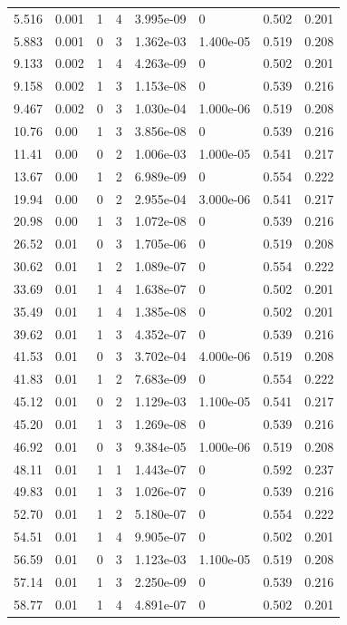 \documentclass[preview]{standalone}
\begin{document}
{{\begin{tabular}{L{1.2cm}C{1.2cm} C{0.3cm}C{0.5cm} C{1.4cm}C{1.4cm} C{1.4cm}C{1.4cm}}
  5.516  &  0.001  & 1     &  4 &  3.995e-09  & 0  & 0.502 &  0.201   \\ 
  5.883  &  0.001  & 0     &  3 &  1.362e-03  & 1.400e-05  & 0.519 &  0.208   \\ 
  9.133  &  0.002  & 1     &  4 &  4.263e-09  & 0  & 0.502 &  0.201   \\ 
  9.158  &  0.002  & 1     &  3 &  1.153e-08  & 0  & 0.539 &  0.216   \\ 
  9.467  &  0.002  & 0     &  3 &  1.030e-04  & 1.000e-06  & 0.519 &  0.208   \\ 
  10.76  &  0.00  & 1     &  3 &  3.856e-08  & 0  & 0.539 &  0.216   \\ 
  11.41  &  0.00  & 0     &  2 &  1.006e-03  & 1.000e-05  & 0.541 &  0.217   \\ 
  13.67  &  0.00  & 1     &  2 &  6.989e-09  & 0  & 0.554 &  0.222   \\ 
  19.94  &  0.00  & 0     &  2 &  2.955e-04  & 3.000e-06  & 0.541 &  0.217   \\ 
  20.98  &  0.00  & 1     &  3 &  1.072e-08  & 0  & 0.539 &  0.216   \\ 
  26.52  &  0.01  & 0     &  3 &  1.705e-06  & 0  & 0.519 &  0.208   \\ 
  30.62  &  0.01  & 1     &  2 &  1.089e-07  & 0  & 0.554 &  0.222   \\ 
  33.69  &  0.01  & 1     &  4 &  1.638e-07  & 0  & 0.502 &  0.201   \\ 
  35.49  &  0.01  & 1     &  4 &  1.385e-08  & 0  & 0.502 &  0.201   \\ 
  39.62  &  0.01  & 1     &  3 &  4.352e-07  & 0  & 0.539 &  0.216   \\ 
  41.53  &  0.01  & 0     &  3 &  3.702e-04  & 4.000e-06  & 0.519 &  0.208   \\ 
  41.83  &  0.01  & 1     &  2 &  7.683e-09  & 0  & 0.554 &  0.222   \\ 
  45.12  &  0.01  & 0     &  2 &  1.129e-03  & 1.100e-05  & 0.541 &  0.217   \\ 
  45.20  &  0.01  & 1     &  3 &  1.269e-08  & 0  & 0.539 &  0.216   \\ 
  46.92  &  0.01  & 0     &  3 &  9.384e-05  & 1.000e-06  & 0.519 &  0.208   \\ 
  48.11  &  0.01  & 1     &  1 &  1.443e-07  & 0  & 0.592 &  0.237   \\ 
  49.83  &  0.01  & 1     &  3 &  1.026e-07  & 0  & 0.539 &  0.216   \\ 
  52.70  &  0.01  & 1     &  2 &  5.180e-07  & 0  & 0.554 &  0.222   \\ 
  54.51  &  0.01  & 1     &  4 &  9.905e-07  & 0  & 0.502 &  0.201   \\ 
  56.59  &  0.01  & 0     &  3 &  1.123e-03  & 1.100e-05  & 0.519 &  0.208   \\ 
  57.14  &  0.01  & 1     &  3 &  2.250e-09  & 0  & 0.539 &  0.216   \\ 
  58.77  &  0.01  & 1     &  4 &  4.891e-07  & 0  & 0.502 &  0.201   \\ 
\hline 
\end{tabular} 

}}
\end{document}
